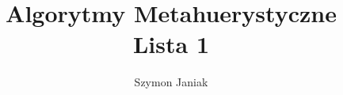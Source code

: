 \documentclass{article}
\title{%
	Algorytmy Metahuerystyczne \\
	\large Lista 1}
\author{Szymon Janiak}
\begin{document}
\maketitle

\sectionfont{\centering}
\subsectionfont{\centering}
\end{document}
